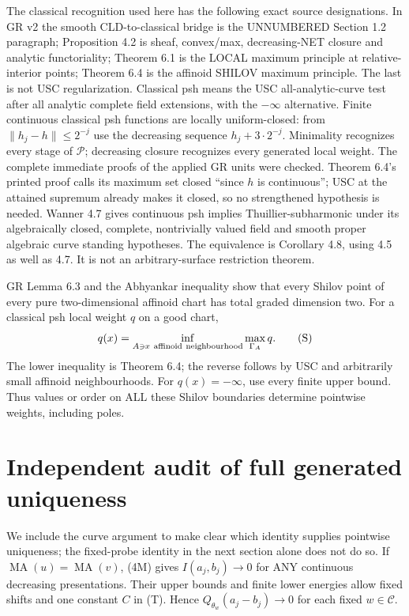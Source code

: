 \documentclass[11pt]{article}
\newcommand{\MA}{\operatorname{MA}}
\newcommand{\C}{\mathcal C}
\theoremstyle{remark}\newtheorem{remark}[theorem]{Remark}
\begin{document}
The classical recognition used here has the following exact source
designations. In GR v2 the smooth CLD-to-classical bridge is the
UNNUMBERED Section 1.2 paragraph; Proposition 4.2 is sheaf, convex/max,
decreasing-NET closure and analytic functoriality; Theorem 6.1 is the
LOCAL maximum principle at relative-interior points; Theorem 6.4 is
the affinoid SHILOV maximum principle. The last is not USC
regularization. Classical psh means the USC all-analytic-curve test
after all analytic complete field extensions, with the $-\infty$
alternative. Finite continuous classical psh functions are locally
uniform-closed: from $\|h_j-h\|\le2^{-j}$ use the decreasing sequence
$h_j+3\cdot2^{-j}$. Minimality recognizes every stage of $\mathscr P$;
decreasing closure recognizes every generated local weight.
The complete immediate proofs of the applied GR units were checked.
Theorem 6.4's printed proof calls its maximum set closed ``since $h$ is
continuous''; USC at the attained supremum already makes it closed,
so no strengthened hypothesis is needed. Wanner 4.7 gives continuous
psh implies Thuillier-subharmonic under its algebraically closed,
complete, nontrivially valued field and smooth proper algebraic curve
standing hypotheses. The equivalence is Corollary 4.8, using 4.5 as
well as 4.7. It is not an arbitrary-surface restriction theorem.

GR Lemma 6.3 and the Abhyankar inequality show that every Shilov point
of every pure two-dimensional affinoid chart has total graded dimension
two. For a classical psh local weight $q$ on a good chart,
\[
q(x)=\inf_{A\ni x\ {\rm affinoid\ neighbourhood}}
\max_{\Gamma_A}q.
\tag{S}
\]
The lower inequality is Theorem 6.4; the reverse follows by USC and
arbitrarily small affinoid neighbourhoods. For $q(x)=-\infty$, use
every finite upper bound. Thus values or order on ALL these Shilov
boundaries determine pointwise weights, including poles.

\section{Independent audit of full generated uniqueness}
We include the curve argument to make clear which identity supplies
pointwise uniqueness; the fixed-probe identity in the next section alone
does not do so. If $\MA(u)=\MA(v)$, (4M) gives $I(a_j,b_j)\to0$
for ANY continuous decreasing presentations. Their upper bounds and
finite lower energies allow fixed shifts and one constant $C$ in (T).
Hence $Q_{\theta_w}(a_j-b_j)\to0$ for each fixed $w\in\C$.
\end{document}
